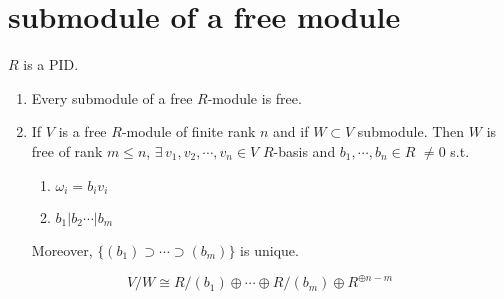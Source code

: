 \section{submodule of a free module}
\begin{theorem}
     $ R  $ is a PID.
     \begin{enumerate}
        \item Every submodule of a free  $ R $-module is free.
        \item If  $ V  $ is a free  $ R  $-module of finite rank  $ n  $ and if  $ W\subset V  $ submodule. Then  $ W  $ is free of rank  $ m  \leq  n $,  $ \exists\,v_1,v_2,\cdots,v_n\in V $  $ R  $-basis and  $ b_1,\cdots,b_n\in R  $  $ \not=0 $ s.t.
        \begin{enumerate}
            \item  $ \omega_i=b_iv_i $ 
            \item  $ b_1|b_2\cdots|b_m $ 
        \end{enumerate} 
        Moreover,  $ \{(b_1)\supset\cdots\supset(b_m)\} $ is unique. 
     \end{enumerate}
\end{theorem}
\begin{observe}
    \[V/W\cong R/(b_1)\oplus \cdots \oplus R/(b_m)\oplus R^{\oplus n-m}\]

\end{observe}
